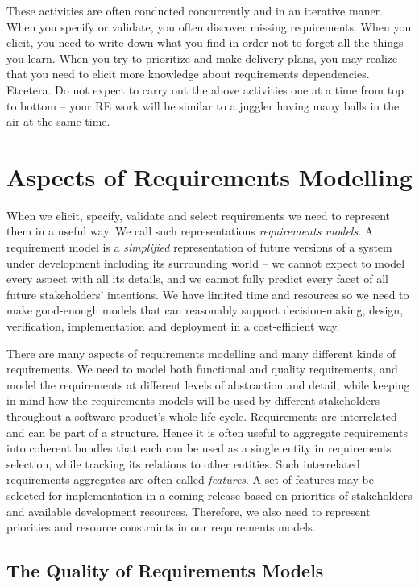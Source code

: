 These activities are often conducted concurrently and in an iterative maner. When you specify or validate, you often discover missing requirements. When you elicit, you need to write down what you find in order not to forget all the things you learn. When you try to prioritize and make delivery plans, you may realize that you need to elicit more knowledge about requirements dependencies. Etcetera. Do not expect to carry out the above activities one at a time from top to bottom -- your RE work will be similar to a juggler having many balls in the air at the same time. 

\section*{Aspects of Requirements Modelling}

When we elicit, specify, validate and select requirements we need to represent them in a useful way. We call such representations \textit{requirements models}. A requirement model is a \emph{simplified} representation of future versions of a system under development including its surrounding world -- we cannot expect to model every aspect with all its details, and we cannot fully predict every facet of all future stakeholders' intentions. We have limited time and resources so we need to make good-enough models that can reasonably support decision-making, design, verification, implementation and deployment in a cost-efficient way.

There are many aspects of requirements modelling and many different kinds of requirements. We need to model both functional and quality requirements, and model the requirements at different levels of abstraction and detail, while keeping in mind how the requirements models will be used by different stakeholders throughout a software product's whole life-cycle. Requirements are interrelated and can be part of a structure. Hence it is often useful to aggregate requirements into coherent bundles that each can be used as a single entity in requirements selection, while tracking its relations to other entities. Such interrelated requirements aggregates are often called \emph{features}. A set of features may be selected for implementation in a coming release based on priorities of stakeholders and available development resources. Therefore, we also need to represent priorities and resource constraints in our requirements models.

\subsection*{The Quality of Requirements Models}

